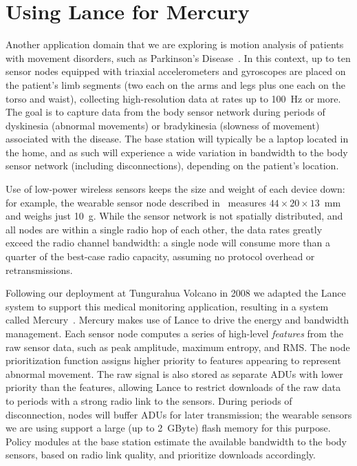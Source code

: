 \section{Using Lance for Mercury}

Another application domain that we are exploring is motion analysis of
patients with movement disorders, such as Parkinson's
Disease~\cite{parkinsons-embs07}. In this context, up to ten sensor nodes
equipped with triaxial accelerometers and gyroscopes are placed on the
patient's limb segments (two each on the arms and legs plus one each on the
torso and waist), collecting high-resolution data at rates up to 100~Hz or
more. The goal is to capture data from the body sensor network during periods
of dyskinesia (abnormal movements) or bradykinesia (slowness of movement)
associated with the disease. The base station will typically be a laptop
located in the home, and as such will experience a wide variation in
bandwidth to the body sensor network (including disconnections), depending on
the patient's location.

Use of low-power wireless sensors keeps the size and weight of each device
down: for example, the wearable sensor node described
in~\cite{parkinsons-embs07} measures $44 \times 20 \times 13$~mm and weighs
just 10~g. While the sensor network is not spatially distributed, and all
nodes are within a single radio hop of each other, the data rates greatly
exceed the radio channel bandwidth: a single node will consume more than a
quarter of the best-case radio capacity, assuming no protocol overhead or
retransmissions.

Following our deployment at Tungurahua Volcano in 2008 we adapted the Lance
system to support this medical monitoring application, resulting in a system
called Mercury~\cite{mercury-sensys09}. Mercury makes use of Lance to drive
the energy and bandwidth management. Each sensor node computes a series of
high-level \textit{features} from the raw sensor data, such as peak
amplitude, maximum entropy, and RMS. The node prioritization function assigns
higher priority to features appearing to represent abnormal movement. The raw
signal is also stored as separate ADUs with lower priority than the features,
allowing Lance to restrict downloads of the raw data to periods with a strong
radio link to the sensors. During periods of disconnection, nodes will buffer
ADUs for later transmission; the wearable sensors we are using support a
large (up to 2~GByte) flash memory for this purpose. Policy modules at the
base station estimate the available bandwidth to the body sensors, based on
radio link quality, and prioritize downloads accordingly.

